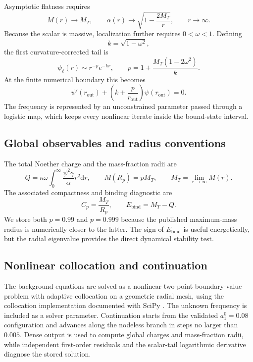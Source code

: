 \documentclass[aps,prd,preprint,onecolumn,nofootinbib,superscriptaddress,showkeys]{revtex4-2}
\newcommand{\dd}{\mathrm{d}}
\begin{document}
Asymptotic flatness requires
\begin{equation}
M(r)\to M_{T},
\qquad
\alpha(r)\to\sqrt{1-\frac{2M_{T}}{r}},
\qquad r\to\infty.
\label{eq:background-asymptotic}
\end{equation}
Because the scalar is massive, localization further requires $0<\omega<1$. Defining
\begin{equation}
k=\sqrt{1-\omega^{2}},
\label{eq:decay}
\end{equation}
the first curvature-corrected tail is
\begin{equation}
\psi_{\ell}(r)\sim r^{-p}e^{-kr},
\qquad
p=1+\frac{M_{T}(1-2\omega^{2})}{k}.
\label{eq:tail}
\end{equation}
At the finite numerical boundary this becomes
\begin{equation}
\psi'(r_{\mathrm{out}})
+\left(k+\frac{p}{r_{\mathrm{out}}}\right)\psi(r_{\mathrm{out}})=0.
\label{eq:background-robin}
\end{equation}
The frequency is represented by an unconstrained parameter passed through a logistic map, which keeps every nonlinear iterate inside the bound-state interval.

\subsection{Global observables and radius conventions}

The total Noether charge and the mass-fraction radii are
\begin{equation}
Q=\kappa\omega\int_{0}^{\infty}\frac{\psi^{2}\gamma}{\alpha}r^{2}\dd r,
\qquad
M(R_{p})=pM_{T},\qquad M_{T}=\lim_{r\to\infty}M(r).
\end{equation}
The associated compactness and binding diagnostic are
\begin{equation}
C_{p}=\frac{M_{T}}{R_{p}},
\qquad
E_{\mathrm{bind}}=M_{T}-Q.
\label{eq:compactness-binding}
\end{equation}
We store both $p=0.99$ and $p=0.999$ because the published maximum-mass radius is numerically closer to the latter. The sign of $E_{\mathrm{bind}}$ is useful energetically, but the radial eigenvalue provides the direct dynamical stability test.

\subsection{Nonlinear collocation and continuation}

The background equations are solved as a nonlinear two-point boundary-value problem with adaptive collocation on a geometric radial mesh, using the collocation implementation documented with SciPy \cite{Virtanen2020}. The unknown frequency is included as a solver parameter. Continuation starts from the validated $a_{1}^{0}=0.08$ configuration and advances along the nodeless branch in steps no larger than $0.005$. Dense output is used to compute global charges and mass-fraction radii, while independent first-order residuals and the scalar-tail logarithmic derivative diagnose the stored solution.
\end{document}
